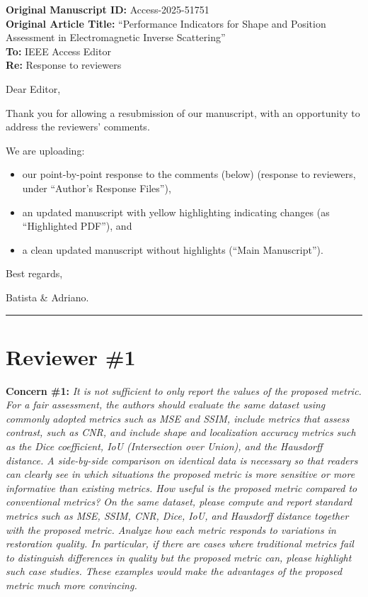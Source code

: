 \documentclass[12pt, a4paper]{article}
\newcommand{\reviewer}[1]{
    \vspace{1cm}
    \hrule
    \section*{Reviewer \##1}
}
\newcommand{\concern}[2]{
    \noindent \textbf{Concern \##1:} \textit{#2}
    \par\vspace{0.3cm}
}
\begin{document}
\noindent \textbf{Original Manuscript ID:} Access-2025-51751 \\
\noindent \textbf{Original Article Title:} ``Performance Indicators for Shape and Position Assessment in Electromagnetic Inverse Scattering'' \\
\noindent \textbf{To:} IEEE Access Editor \\
\noindent \textbf{Re:} Response to reviewers

\vspace{1cm}

\noindent Dear Editor,

\noindent Thank you for allowing a resubmission of our manuscript, with an opportunity to address the reviewers’ comments.

\noindent We are uploading:
\begin{itemize}
    \item[(a)] our point-by-point response to the comments (below) (response to reviewers, under ``Author’s Response Files''),
    \item[(b)] an updated manuscript with yellow highlighting indicating changes (as ``Highlighted PDF''), and
    \item[(c)] a clean updated manuscript without highlights (``Main Manuscript'').
\end{itemize}

\vspace{0.5cm}

\noindent Best regards,

\noindent Batista \& Adriano.

\newpage


\reviewer{1}

\concern{1}{It is not sufficient to only report the values of the proposed metric. For a fair assessment, the authors should evaluate the same dataset using
commonly adopted metrics such as MSE and SSIM, include metrics that assess contrast, such as CNR, and include shape and localization accuracy metrics such as the Dice coefficient, IoU (Intersection over Union), and the Hausdorff distance. A side-by-side comparison on identical data is necessary so that readers can clearly see in which situations the proposed metric is more sensitive or more informative than existing metrics. How useful is the proposed metric compared to conventional metrics? On the same dataset, please compute and report standard metrics such as MSE, SSIM, CNR, Dice, IoU, and Hausdorff distance together with the proposed metric. Analyze how each metric responds to variations
in restoration quality. In particular, if there are cases where traditional metrics fail to distinguish differences in quality but the proposed metric can, please highlight such case studies. These examples would make the advantages of the proposed metric much more convincing.}
\end{document}
